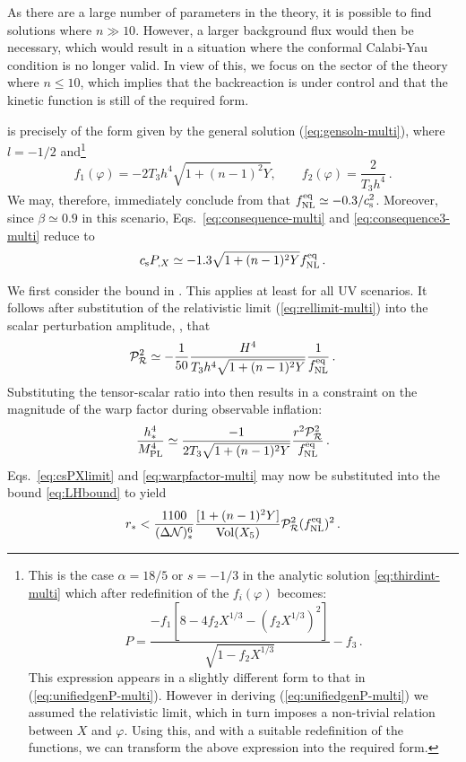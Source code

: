 As there are a large
number of 
parameters in the theory, it is possible to find solutions 
where $n \gg 10$. However, a larger background flux would then be necessary, which
would result 
in a situation where the conformal 
Calabi-Yau condition is no longer valid. In view of this, we focus on
the sector of the theory where $n \le 10$, which implies that the 
backreaction is under control and that the kinetic function
is still of the required form. 


 is precisely of the form given by the 
general solution (\ref{eq:gensoln-multi}), where $l=-1/2$ 
and\footnote{This is the
case $\alpha =18/5$ or $s=-1/3$ in the analytic solution
\eqref{eq:thirdint-multi} which after redefinition of the $f_i (\varphi)$
becomes:
% 
\begin{equation}
P = \frac{-f_1\left[8 - 4f_2X^{1/3}
-\left(f_2X^{1/3}\right)^2\right]}{\sqrt{1-f_2X^{1/3}}} -f_3 \, .
\end{equation}
% 
This expression appears in a slightly different 
form to that in (\ref{eq:unifiedgenP-multi}). 
However in deriving (\ref{eq:unifiedgenP-multi}) we assumed the
relativistic limit, which in turn imposes a non-trivial 
relation between $X$ and $\varphi$. Using this, and with a 
suitable redefinition of the functions, we can
transform the above expression into the required form.} 
% 
\begin{equation}
\label{eq:fdefns-multi}
f_1 (\varphi) = -2T_3 h^4 \sqrt{1+(n-1)^2Y} , \qquad 
f_2 (\varphi) = \frac{2}{T_3 h^4} \,.
\end{equation}
% 
We may, therefore, immediately conclude from  that
$f_{\mathrm{NL}}^{\mathrm{eq}}
\simeq -0.3/c_\mathrm{s}^2$. Moreover, since $\beta \simeq 0.9$ in this scenario, 
Eqs.~\eqref{eq:consequence-multi} and \eqref{eq:consequence3-multi} reduce to  
% 
\begin{equation}
\label{eq:csPXlimit}
c_\mathrm{s} P_{,X} \simeq -1.3 \sqrt{1+(n-1)^2Y} f_{\mathrm{NL}}^{\mathrm{eq}} \,.
\end{equation}
% 


We first consider the bound in . This applies at least for all
UV scenarios. It follows after substitution of the relativistic limit
(\ref{eq:rellimit-multi}) into the scalar perturbation amplitude,
,
that 
% 
\begin{equation}
\label{eq:usefulPs-multi}
\mathcal{P}_{\mathcal{R}}^2  \simeq -\frac{1}{50} \frac{H^4}{T_3 h^4\sqrt{1+(n-1)^2Y}}
\frac{1}{f_{\mathrm{NL}}^{\mathrm{eq}}}\,.
\end{equation}
% 
Substituting the tensor-scalar ratio into  
 then results in a constraint on the magnitude of 
the warp factor during observable inflation:
%  
\begin{equation}
\label{eq:warpfactor-multi}
\frac{h^4_*}{M_{\mathrm{PL}}^4} \simeq \frac{-1}{2 T_3 \sqrt{1+(n-1)^2Y}} 
\frac{r^2 \mathcal{P}_{\mathcal{R}}^2 }{f_{\mathrm{NL}}^{\mathrm{eq}}} \,.
\end{equation}
% 
Eqs.~\eqref{eq:csPXlimit} and \eqref{eq:warpfactor-multi} may now be
substituted into 
the bound \eqref{eq:LHbound} to yield
%  
\begin{equation}
\label{eq:actualLH-multi}
r_* < \frac{1100}{(\Delta \mathcal{N} )_*^6} 
\frac{[1+(n-1)^2Y]}{\mathrm{Vol} (X_5)} \mathcal{P}_{\mathcal{R}}^2  (f_{\mathrm{NL}}^{\mathrm{eq}})^2 \,.
\end{equation}
% 


